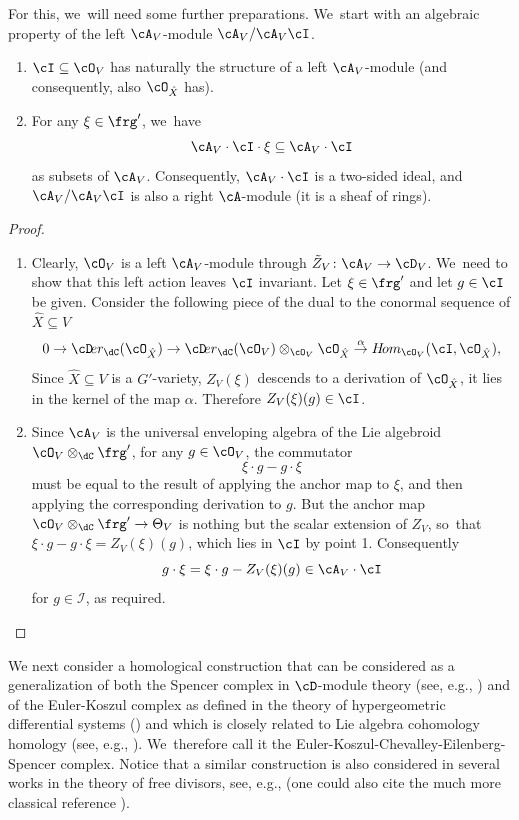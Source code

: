 For this, we~will need some further preparations. We~start with an algebraic property of the left $\cA_V$\nobreakdash-mod\-ule
$\cA_V/\cA_V\cI$.

\skpt
\begin{lem}
\label{lem:IleftAmod}
\begin{enumerate}
\item
$\cI\subseteq\cO_V$ has naturally the structure of a left $\cA_V$\nobreakdash-mod\-ule (and consequently, also $\cO_{\hat{X}}$ has).

\item
For any $\xi\in\frg'$, we~have
\[
\cA_V\cdot \cI \cdot \xi \subseteq\cA_V\cdot \cI
\]
as subsets of $\cA_V$. Consequently, $\cA_V\cdot \cI$ is a two-sided ideal, and $\cA_V/\cA_V\cI$
is also a right $\cA$\nobreakdash-mod\-ule (\ie it is a sheaf of rings).
\end{enumerate}
\end{lem}

\skpt
\begin{proof}
\begin{enumerate}
\item
Clearly, $\cO_V$ is a left $\cA_V$\nobreakdash-mod\-ule
through $\tilde{Z}_V \colon \cA_V\to \cD_V$. We~need to show that this left action leaves $\cI$ invariant. Let $\xi\in \frg'$ and let $g\in \cI$ be given.
Consider the following piece
of the dual to the conormal sequence of $\hat{X}\subseteq V$
\[
0\to
{\cD\!}er_{\dC}(\cO_{\hat{X}})
\to
{\cD\!er}_{\dC}(\cO_V)\otimes_{\cO_V}\cO_{\hat{X}}
\stackrel{\alpha}{\to} {H\!}om_{\cO_V}(\cI,\cO_{\hat{X}}),
\]
Since $\hat{X}\subseteq V$ is a $G'$-variety, $Z_V(\xi)$ descends to a derivation of $\cO_{\hat{X}}$, \ie it lies in the kernel of the map $\alpha$. Therefore $Z_V(\xi)(g)\in \cI$.
\item
Since $\cA_V$ is the universal enveloping algebra of the Lie algebroid $\cO_V\otimes_\dC \frg'$, for any $g\in \cO_V$, the commutator
\[
\xi\cdot g-g\cdot\xi
\]
must be equal to the result of applying the anchor map to $\xi$, and then applying the corresponding derivation to $g$. But the anchor map $\cO_V\otimes_\dC\frg'\to \Theta_V$ is nothing but the scalar extension of $Z_V$, so~that $\xi\cdot g-g\cdot\xi=Z_V(\xi)(g)$, which lies in $\cI$ by point 1. Consequently
\[
g\cdot \xi=\xi\cdot g-Z_V(\xi)(g) \in \cA_V\cdot \cI
\]
for $g\in \mathcal{I}$, as required.\qedhere
\end{enumerate}
\end{proof}

We next consider a homological construction that can be considered as a generalization of both the Spencer complex in $\cD$\nobreakdash-mod\-ule theory (see, e.g., \cite[Lem.\,1.5.27.]{Hotta}) and of the Euler-Koszul complex as defined in the theory of hypergeometric differential systems (\cite[\S 4]{MMW}) and which is closely related to Lie algebra cohomology \resp homology (see, e.g., \cite[\S VII.4]{HiltonStammbach}). We~therefore call it the Euler-Koszul-Chevalley-Eilenberg-Spencer complex. Notice that a similar construction is also considered in several works in the theory of free divisors, see, e.g., \cite[\S 1.1.2.]{CN08} (one could also cite the much more classical reference \cite[\S 4]{Rinehart}).

